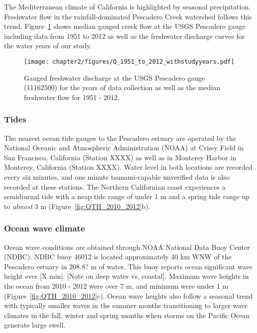 The Mediterranean climate of California is highlighted by seasonal
precipitation. Freshwater flow in the rainfall-dominated Pescadero Creek watershed follows this trend. Figure~\ref{fig:Q_1951_2012} shows median gauged creek flow at the USGS Pescadero gauge including data from 1951 to 2012 as well as the freshwater discharge curves for the water years of our study. 


\begin{figure}
\texttt{[image: chapter2/figures/Q\_1951\_to\_2012\_withstudyyears.pdf]} 
\caption{Gauged freshwater discharge at the USGS Pescadero gauge (11162500) for the years of data collection as well as the median freshwater flow for 1951 - 2012.}\label{fig:Q_1951_2012} \end{figure}


\subsubsection{Tides}
The nearest ocean tide gauges to the Pescadero estuary are
operated by the National Oceanic and Atmospheric Administration (NOAA)
at Crissy Field in San Francisco, California (Station XXXX) as well as
in Monterey Harbor in Monterey, California (Station XXXX). Water
level in both locations are recorded every six minutes, and one minute
tsunami-capable unverified data is also recorded at these stations. The Northern Californian coast experiences a semidiurnal tide with a neap tide range of under 1 m and a spring tide range up to \emph{almost} 3 m (Figure~\ref{fig:QTH_2010_2012}b).


\subsubsection{Ocean wave climate}
Ocean wave conditions are obtained through NOAA National
Data Buoy Center (NDBC). NDBC buoy 46012 is located approximately 40 km
WNW of the Pescadero estuary in 208.8? m of water. This buoy reports
ocean significant wave height ever [X min]. [Note on deep water vs.
coastal]. Maximum wave heights in the ocean from 2010 - 2012 were over 7 m,
and minimum were under 1 m (Figure~\ref{fig:QTH_2010_2012}c). Ocean wave heights also follow a seasonal trend with typically smaller waves in the summer months transitioning to larger wave climates in the fall, winter and spring months when storms on the Pacific Ocean generate large swell.

